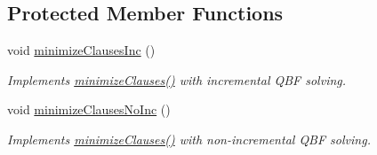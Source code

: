 \subsection*{Protected Member Functions}
\begin{DoxyCompactItemize}
\item 
void \hyperlink{classClauseMinimizerQBF_ad4fc52f7889e0ee84a11da70f300ed8f}{minimize\-Clauses\-Inc} ()
\begin{DoxyCompactList}\small\item\em Implements \hyperlink{classClauseMinimizerQBF_a5f6aca824bfe92db2355483d40db140f}{minimize\-Clauses()} with incremental Q\-B\-F solving. \end{DoxyCompactList}\item 
void \hyperlink{classClauseMinimizerQBF_aa93debdabc9ed6a9808e3e19ea5c16b8}{minimize\-Clauses\-No\-Inc} ()
\begin{DoxyCompactList}\small\item\em Implements \hyperlink{classClauseMinimizerQBF_a5f6aca824bfe92db2355483d40db140f}{minimize\-Clauses()} with non-\/incremental Q\-B\-F solving. \end{DoxyCompactList}\end{DoxyCompactItemize}
